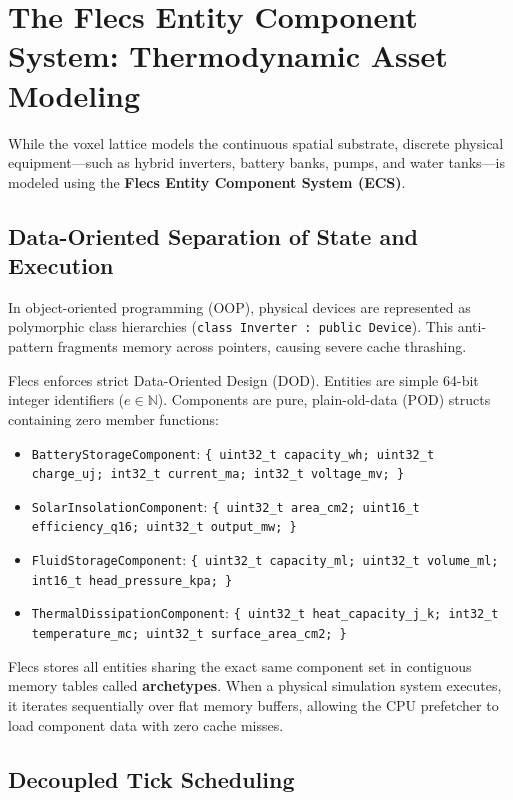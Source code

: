 \section{The Flecs Entity Component System: Thermodynamic Asset Modeling}

While the voxel lattice models the continuous spatial substrate, discrete physical equipment---such as hybrid inverters, battery banks, pumps, and water tanks---is modeled using the \textbf{Flecs Entity Component System (ECS)}.

\subsection{Data-Oriented Separation of State and Execution}

In object-oriented programming (OOP), physical devices are represented as polymorphic class hierarchies (\texttt{class Inverter : public Device}). This anti-pattern fragments memory across pointers, causing severe cache thrashing.

Flecs enforces strict Data-Oriented Design (DOD). Entities are simple 64-bit integer identifiers ($e \in \mathbb{N}$). Components are pure, plain-old-data (POD) structs containing zero member functions:
\begin{itemize}
    \item \texttt{BatteryStorageComponent}: \texttt{\{ uint32\_t capacity\_wh; uint32\_t charge\_uj; int32\_t current\_ma; int32\_t voltage\_mv; \}}
    \item \texttt{SolarInsolationComponent}: \texttt{\{ uint32\_t area\_cm2; uint16\_t efficiency\_q16; uint32\_t output\_mw; \}}
    \item \texttt{FluidStorageComponent}: \texttt{\{ uint32\_t capacity\_ml; uint32\_t volume\_ml; int16\_t head\_pressure\_kpa; \}}
    \item \texttt{ThermalDissipationComponent}: \texttt{\{ uint32\_t heat\_capacity\_j\_k; int32\_t temperature\_mc; uint32\_t surface\_area\_cm2; \}}
\end{itemize}

Flecs stores all entities sharing the exact same component set in contiguous memory tables called \textbf{archetypes}. When a physical simulation system executes, it iterates sequentially over flat memory buffers, allowing the CPU prefetcher to load component data with zero cache misses.

\subsection{Decoupled Tick Scheduling}


